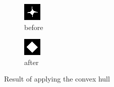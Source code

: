 \documentclass[12pt]{article}
\renewcommand{\subfiguresize}{.25\textwidth}
\begin{document}
\begin{figure}[H]
    \begin{subfigure}[t]{\subfiguresize}
        \includegraphics[width=\textwidth]{img/image2.png}
        \caption{before}
    \end{subfigure}
    \hspace{2em}
    \begin{subfigure}[t]{\subfiguresize}
        \includegraphics[width=\textwidth]{img/image2-convexhull.png}
        \caption{after}
    \end{subfigure}
    \caption{Result of applying the convex hull}
\end{figure}
\end{document}

